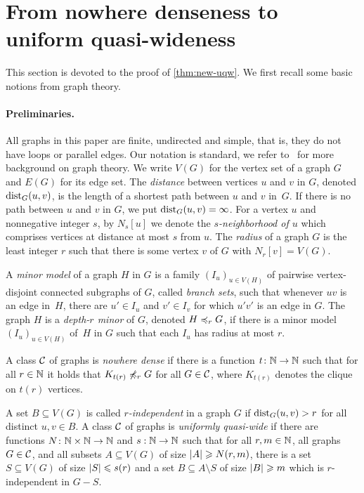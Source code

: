 \section{From nowhere denseness to uniform quasi-wideness}\label{sec:uqw}

This section is devoted to the proof of \cref{thm:new-uqw}. 
We first recall some basic notions from graph theory. 

\paragraph*{Preliminaries.}
All graphs in this paper are finite, undirected and simple, that is, 
they do not have loops or parallel edges. Our notation is standard,
we refer to~\cite{diestel2012graph} for more background on 
graph theory. 
We write $V(G)$ for the vertex set of a graph $G$ and
$E(G)$ for its edge set. 
The {\em{distance}} between vertices $u$ and $v$ in $G$, denoted $\mathrm{dist}_G(u,v)$, is the length of a shortest path between $u$ and $v$ in~$G$.
If there is no path between $u$ and $v$ in $G$, we put $\mathrm{dist}_G(u,v)=\infty$.
For a vertex $u$ and nonnegative integer $s$, by $N_s[u]$ we denote the {\em{$s$-neighborhood of $u$}} which comprises vertices at distance at most $s$ from $u$.
The \emph{radius} of a graph $G$ is the least integer $r$ such that there is some vertex $v$ of $G$ with $N_r[v]=V(G)$.


A {\em{minor model}} of a graph $H$ in $G$ is a family $(I_u)_{u\in V(H)}$ of pairwise vertex-disjoint connected subgraphs of $G$, called {\em{branch sets}},
such that whenever $uv$ is an edge in~$H$, there are $u'\in I_u$ and $v'\in I_v$ for which $u'v'$ 
is an edge in $G$.
The graph $H$ is a {\em{depth-$r$ minor}} of $G$, denoted $H\preccurlyeq_rG$, if there is a minor model
$(I_u)_{u\in V(H)}$ of~$H$ in $G$ such that each $I_u$ has radius at most $r$.

A class $\mathcal{C}$ of graphs is \emph{nowhere dense} if there is a function 
$t\colon \mathbb{N}\rightarrow \mathbb{N}$ such that for all $r\in \mathbb{N}$ it holds that $K_{t(r)}\not\preccurlyeq_r G$
for all $G\in \mathcal{C}$, where $K_{t(r)}$ denotes the clique on $t(r)$ vertices.

A set $B\subseteq V(G)$ is called {\em{$r$-independent}} in a graph $G$ if  $\mathrm{dist}_G(u,v)>r$ for all
distinct $u,v\in B$.
A class $\mathcal{C}$ of graphs is \emph{uniformly quasi-wide} if there are
functions $N\colon \mathbb{N}\times\mathbb{N}\rightarrow \mathbb{N}$ and $s:\mathbb{N}\rightarrow \mathbb{N}$ such
that for all $r,m\in \mathbb{N}$, all graphs $G\in \mathcal{C}$, and all subsets $A\subseteq V(G)$ of size $\left\lvert A\right\rvert\geqslant N(r,m)$, there is a set
$S\subseteq V(G)$ of size $\left\lvert S\right\rvert\leqslant s(r)$ and a set
$B\subseteq A\setminus S$ of size $\left\lvert B\right\rvert\geqslant m$ which is $r$-independent in
$G-S$. 

